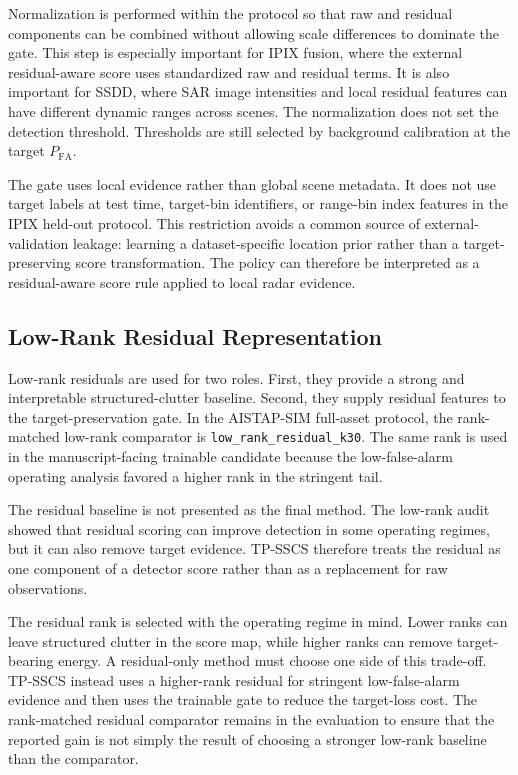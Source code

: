 \documentclass[journal]{IEEEtran}
\begin{document}
Normalization is performed within the protocol so that raw and residual components can be combined without allowing scale differences to dominate the gate. This step is especially important for IPIX fusion, where the external residual-aware score uses standardized raw and residual terms. It is also important for SSDD, where SAR image intensities and local residual features can have different dynamic ranges across scenes. The normalization does not set the detection threshold. Thresholds are still selected by background calibration at the target $P_{\mathrm{FA}}$.

The gate uses local evidence rather than global scene metadata. It does not use target labels at test time, target-bin identifiers, or range-bin index features in the IPIX held-out protocol. This restriction avoids a common source of external-validation leakage: learning a dataset-specific location prior rather than a target-preserving score transformation. The policy can therefore be interpreted as a residual-aware score rule applied to local radar evidence.

\subsection{Low-Rank Residual Representation}

Low-rank residuals are used for two roles. First, they provide a strong and interpretable structured-clutter baseline. Second, they supply residual features to the target-preservation gate. In the AISTAP-SIM full-asset protocol, the rank-matched low-rank comparator is \texttt{low\_rank\_residual\_k30}. The same rank is used in the manuscript-facing trainable candidate because the low-false-alarm operating analysis favored a higher rank in the stringent tail.

The residual baseline is not presented as the final method. The low-rank audit showed that residual scoring can improve detection in some operating regimes, but it can also remove target evidence. TP-SSCS therefore treats the residual as one component of a detector score rather than as a replacement for raw observations.

The residual rank is selected with the operating regime in mind. Lower ranks can leave structured clutter in the score map, while higher ranks can remove target-bearing energy. A residual-only method must choose one side of this trade-off. TP-SSCS instead uses a higher-rank residual for stringent low-false-alarm evidence and then uses the trainable gate to reduce the target-loss cost. The rank-matched residual comparator remains in the evaluation to ensure that the reported gain is not simply the result of choosing a stronger low-rank baseline than the comparator.
\end{document}
